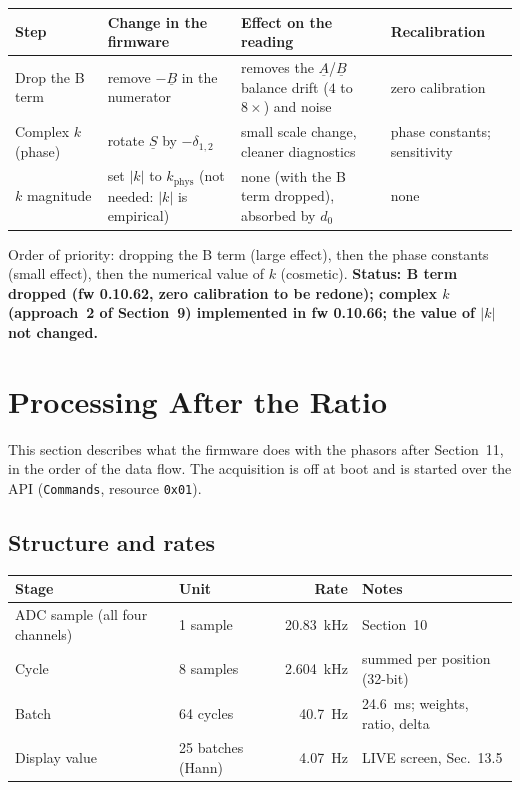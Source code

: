 \documentclass[11pt,a4paper]{article}
\begin{document}
\begin{center}
\small
\begin{tabular}{@{}p{}p{}p{}p{}@{}}
\toprule
Step & Change in the firmware & Effect on the reading & Recalibration \\
\midrule
Drop the B term & remove $-\underline{B}$ in the numerator
  & removes the $\underline{A}$/$\underline{B}$ balance drift ($4$ to $8\times$) and noise
  & zero calibration \\
Complex $k$ (phase) & rotate $\underline{S}$ by $-\delta_{1,2}$
  & small scale change, cleaner diagnostics
  & phase constants; sensitivity \\
$k$ magnitude & set $|k|$ to $k_{\mathrm{phys}}$ (not needed: $|k|$ is empirical)
  & none (with the B term dropped), absorbed by $d_0$
  & none \\
\bottomrule
\end{tabular}
\end{center}
Order of priority: dropping the B term (large effect), then the phase constants (small
effect), then the numerical value of $k$ (cosmetic).  \textbf{Status: B term dropped
(fw 0.10.62, zero calibration to be redone); complex $k$ (approach~2 of Section~9)
implemented in fw 0.10.66; the value of $|k|$ not changed.}

\section{Processing After the Ratio}

This section describes what the firmware does with the phasors after
Section~11, in the order of the data flow.  The acquisition is off at boot
and is started over the API (\texttt{Commands}, resource \texttt{0x01}).

\subsection{Structure and rates}

\begin{center}
\small
\begin{tabular}{@{}llrl@{}}
\toprule
Stage & Unit & Rate & Notes \\
\midrule
ADC sample (all four channels) & 1 sample & \SI{20.83}{\kilo\hertz} & Section~10 \\
Cycle & 8 samples & \SI{2.604}{\kilo\hertz} & summed per position (32-bit) \\
Batch & 64 cycles & \SI{40.7}{\hertz} & \SI{24.6}{\milli\second}; weights, ratio, delta \\
Display value & 25 batches (Hann) & \SI{4.07}{\hertz} & LIVE screen, Sec.~13.5 \\
\bottomrule
\end{tabular}
\end{center}
\end{document}
